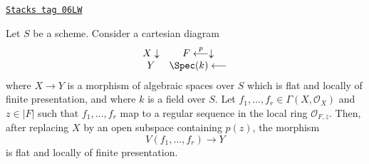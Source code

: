 \begin{lemma}[Slice]
\label{spaces-more-morphisms-lemma-slice}
\href{https://stacks.math.columbia.edu/tag/06LW}{\texttt{Stacks tag 06LW}}

Let $S$ be a scheme. Consider a cartesian diagram
$$
\begin{array}{cc}X \downarrow & F \overset{p}{\longleftarrow}\downarrow \\ Y & \Spec(k) \longleftarrow\end{array}
$$
where $X \to Y$ is a morphism of algebraic spaces over $S$
which is flat and locally of finite presentation, and where
$k$ is a field over $S$. Let $f_1, \ldots, f_r \in \Gamma(X, \mathcal{O}_X)$
and $z \in |F|$ such that $f_1, \ldots, f_r$ map to a regular sequence
in the local ring $\mathcal{O}_{F, \overline{z}}$.
Then, after replacing $X$ by an open subspace containing $p(z)$, the morphism
$$
V(f_1, \ldots, f_r) \longrightarrow Y
$$
is flat and locally of finite presentation.
\end{lemma}

